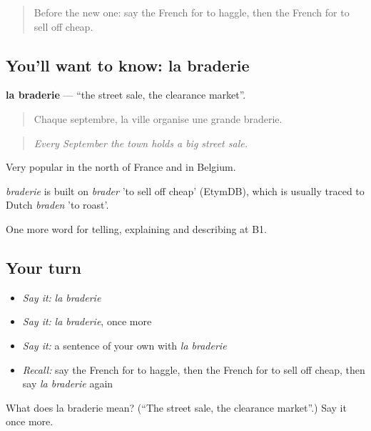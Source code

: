 \label{lesson:FR-C452-braderie}



\begin{quote}
Before the new one: say the French for to haggle, then the French for to sell off cheap.
\end{quote}

\subsection*{You'll want to know: la braderie}
\textbf{la braderie} — \textquotedblleft{}the street sale, the clearance market\textquotedblright{}.

\begin{quote}
Chaque septembre, la ville organise une grande braderie.
\end{quote}

\begin{quote}
\emph{Every September the town holds a big street sale.}
\end{quote}

Very popular in the north of France and in Belgium.

\begin{cousinweb}
\emph{braderie} is built on \emph{brader} 'to sell off cheap' (EtymDB), which is usually traced to Dutch \emph{braden} 'to roast'.
\end{cousinweb}

\begin{grammarlens}[title={What you've built}]
One more word for telling, explaining and describing at B1.
\end{grammarlens}

\subsection*{Your turn}
\begin{itemize}
\raggedright
  \item \emph{Say it:} \emph{la braderie}
  \item \emph{Say it:} \emph{la braderie}, once more
  \item \emph{Say it:} a sentence of your own with \emph{la braderie}
  \item \emph{Recall:} say the French for to haggle, then the French for to sell off cheap, then say \emph{la braderie} again
\end{itemize}

\begin{tcolorbox}[breakable,colback=teal!4,colframe=teal!35!black,title={Before you move on}]
What does la braderie mean? (\textquotedblleft{}The street sale, the clearance market\textquotedblright{}.) Say it once more.
\end{tcolorbox}
